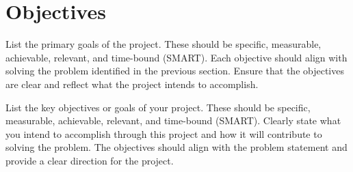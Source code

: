\section{Objectives} 
List the primary goals of the project. These should be specific, measurable, achievable, relevant, and time-bound (SMART). Each objective should align with solving the problem identified in the previous section. Ensure that the objectives are clear and reflect what the project intends to accomplish.

List the key objectives or goals of your project. These should be specific, measurable, achievable, relevant, and time-bound (SMART). Clearly state what you intend to accomplish through this project and how it will contribute to solving the problem. The objectives should align with the problem statement and provide a clear direction for the project.
